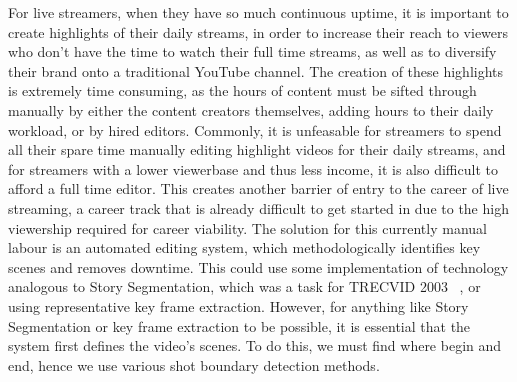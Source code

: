 \documentclass[12pt]{article}
\begin{document}
    For live streamers, when they have so much continuous uptime, it is important to create highlights of their daily streams, in order to increase their reach to viewers who
don't have the time to watch their full time streams, as well as to diversify their brand onto a traditional YouTube channel. The creation of these highlights is extremely
time consuming, as the hours of content must be sifted through manually by either the content creators themselves, adding hours to their daily workload, or by hired editors. 
Commonly, it is unfeasable for streamers to spend all their spare time manually editing highlight videos for their daily streams, and for streamers with a lower viewerbase
and thus less income, it is also difficult to afford a full time editor. This creates another barrier of entry to the career of live streaming, a career track that is already
difficult to get started in due to the high viewership required for career viability. The solution for this currently manual labour is an automated editing system, which 
methodologically identifies key scenes and removes downtime. This could use some implementation of technology analogous to Story Segmentation, which was a task for TRECVID 2003
~\cite{storyseg}, or using representative key frame extraction. However, for anything like Story Segmentation or key frame extraction to be possible, it is essential that the
system first defines the video's scenes. To do this, we must find where begin and end, hence we use various shot boundary detection methods. 
\end{document}
